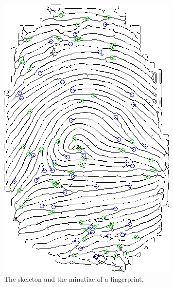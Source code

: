 \documentclass[8pt]{article}
\begin{document}
\begin{figure}
	\centering
	\begin{subfigure}{.48\textwidth}
	\centering
	\includegraphics[width=.75\linewidth]{img/skemin}
	\caption{The skeleton and the minutiae of a fingerprint.}
	\label{fig:skemin}
	\end{subfigure}%
	\hfill
	\begin{subfigure}{.48\textwidth}
	  \centering

\end{subfigure}
\end{figure}
\end{document}
